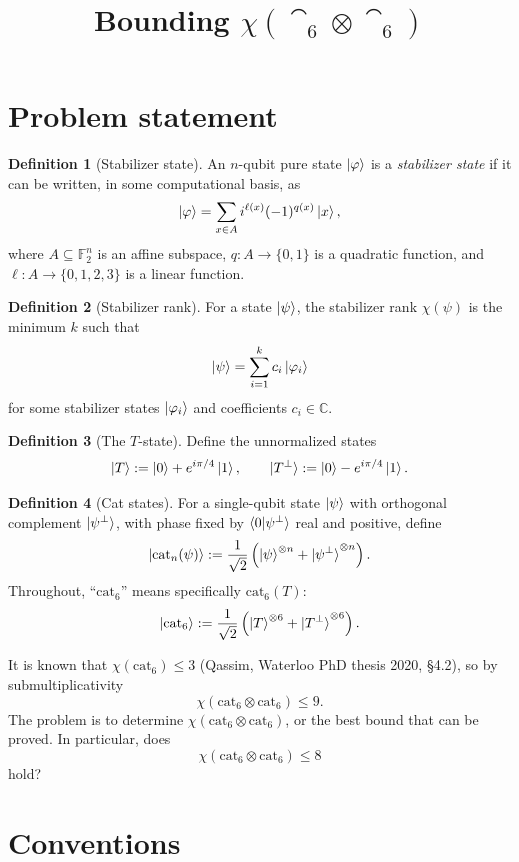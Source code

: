 \documentclass[11pt]{article}
\title{Bounding $\chi(\cat_6\otimes\cat_6)$}
\author{}
\date{}
\theoremstyle{definition}
\newtheorem{definition}{Definition}
\newcommand{\F}{\mathbb{F}}
\newcommand{\cat}{\mathrm{cat}}
\begin{document}
\maketitle

\section{Problem statement}

\begin{definition}[Stabilizer state]
An $n$-qubit pure state $\ket{\varphi}$ is a \emph{stabilizer state} if it can be written, in some computational basis, as
\[
\ket{\varphi}=\sum_{x\in A}i^{\ell(x)}(-1)^{q(x)}\ket{x},
\]
where $A\subseteq\F_2^n$ is an affine subspace, $q:A\to\{0,1\}$ is a quadratic function, and $\ell:A\to\{0,1,2,3\}$ is a linear function.
\end{definition}

\begin{definition}[Stabilizer rank]
For a state $\ket{\psi}$, the stabilizer rank $\chi(\psi)$ is the minimum $k$ such that
\[
\ket{\psi}=\sum_{i=1}^k c_i\ket{\varphi_i}
\]
for some stabilizer states $\ket{\varphi_i}$ and coefficients $c_i\in\mathbb{C}$.
\end{definition}

\begin{definition}[The $T$-state]
Define the unnormalized states
\[
\ket{T}:=\ket{0}+e^{i\pi/4}\ket{1},
\qquad
\ket{T^\perp}:=\ket{0}-e^{i\pi/4}\ket{1}.
\]
\end{definition}

\begin{definition}[Cat states]
For a single-qubit state $\ket{\psi}$ with orthogonal complement $\ket{\psi^\perp}$, with phase fixed by $\braket{0|\psi^\perp}$ real and positive, define
\[
\ket{\cat_n(\psi)}:=\frac{1}{\sqrt{2}}
\left(\ket{\psi}^{\otimes n}+\ket{\psi^\perp}^{\otimes n}\right).
\]
Throughout, ``$\cat_6$'' means specifically $\cat_6(T)$:
\[
\ket{\cat_6}:=\frac{1}{\sqrt{2}}
\left(\ket{T}^{\otimes6}+\ket{T^\perp}^{\otimes6}\right).
\]
\end{definition}

It is known that $\chi(\cat_6)\leq3$ (Qassim, Waterloo PhD thesis 2020, \S4.2), so by submultiplicativity
\[
\chi(\cat_6\otimes\cat_6)\leq9.
\]
The problem is to determine $\chi(\cat_6\otimes\cat_6)$, or the best bound that can be proved. In particular, does
\[
\chi(\cat_6\otimes\cat_6)\leq8
\]
hold?

\section{Conventions}
\end{document}
